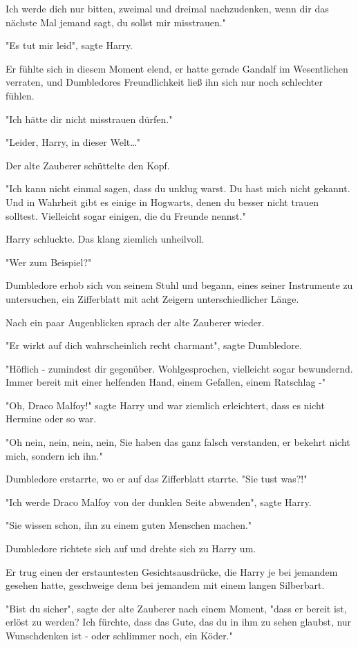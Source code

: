 {Ich werde dich nur bitten, zweimal und dreimal nachzudenken, wenn dir das nächste Mal jemand sagt, du sollst mir misstrauen."

"Es tut mir leid", sagte Harry.

Er fühlte sich in diesem Moment elend, er hatte gerade Gandalf im Wesentlichen verraten, und Dumbledores Freundlichkeit ließ ihn sich nur noch schlechter fühlen.

"Ich hätte dir nicht misstrauen dürfen."

"Leider, Harry, in dieser Welt…"

Der alte Zauberer schüttelte den Kopf.

"Ich kann nicht einmal sagen, dass du unklug warst. Du hast mich nicht gekannt. Und in Wahrheit gibt es einige in Hogwarts, denen du besser nicht trauen solltest. Vielleicht sogar einigen, die du Freunde nennst."

Harry schluckte. Das klang ziemlich unheilvoll.

"Wer zum Beispiel?"

Dumbledore erhob sich von seinem Stuhl und begann, eines seiner Instrumente zu untersuchen, ein Zifferblatt mit acht Zeigern unterschiedlicher Länge.

Nach ein paar Augenblicken sprach der alte Zauberer wieder.

"Er wirkt auf dich wahrscheinlich recht charmant", sagte Dumbledore.

"Höflich - zumindest dir gegenüber. Wohlgesprochen, vielleicht sogar bewundernd. Immer bereit mit einer helfenden Hand, einem Gefallen, einem Ratschlag -"

"Oh, Draco Malfoy!" sagte Harry und war ziemlich erleichtert, dass es nicht Hermine oder so war.

"Oh nein, nein, nein, nein, Sie haben das ganz falsch verstanden, er bekehrt nicht mich, sondern ich ihn."

Dumbledore erstarrte, wo er auf das Zifferblatt starrte. "Sie tust was?!"

"Ich werde Draco Malfoy von der dunklen Seite abwenden", sagte Harry.

"Sie wissen schon, ihn zu einem guten Menschen machen."

Dumbledore richtete sich auf und drehte sich zu Harry um.

Er trug einen der erstauntesten Gesichtsausdrücke, die Harry je bei jemandem gesehen hatte, geschweige denn bei jemandem mit einem langen Silberbart.

"Bist du sicher", sagte der alte Zauberer nach einem Moment, "dass er bereit ist, erlöst zu werden? Ich fürchte, dass das Gute, das du in ihm zu sehen glaubst, nur Wunschdenken ist - oder schlimmer noch, ein Köder."

}
